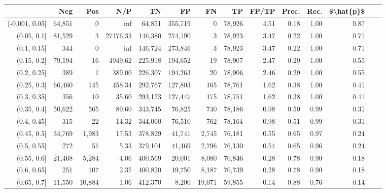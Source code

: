 \begin{tabular}{rrrrrrrrrrrrrr}
\toprule
{} &     Neg &     Pos &       N/P &       TN &       FP &      FN &      TP & FP/TP & Prec. &  Rec. & \$\textbackslash hat\{p\}\$ \\
\midrule
(-0.001, 0.05] &  64,851 &       0 &       inf &   64,851 &  355,719 &       0 &  78,926 &  4.51 &  0.18 &  1.00 &      0.87 \\
(0.05, 0.1]    &  81,529 &       3 &  27176.33 &  146,380 &  274,190 &       3 &  78,923 &  3.47 &  0.22 &  1.00 &      0.71 \\
(0.1, 0.15]    &     344 &       0 &       inf &  146,724 &  273,846 &       3 &  78,923 &  3.47 &  0.22 &  1.00 &      0.71 \\
(0.15, 0.2]    &  79,194 &      16 &   4949.62 &  225,918 &  194,652 &      19 &  78,907 &  2.47 &  0.29 &  1.00 &      0.55 \\
(0.2, 0.25]    &     389 &       1 &    389.00 &  226,307 &  194,263 &      20 &  78,906 &  2.46 &  0.29 &  1.00 &      0.55 \\
(0.25, 0.3]    &  66,460 &     145 &    458.34 &  292,767 &  127,803 &     165 &  78,761 &  1.62 &  0.38 &  1.00 &      0.41 \\
(0.3, 0.35]    &     356 &      10 &     35.60 &  293,123 &  127,447 &     175 &  78,751 &  1.62 &  0.38 &  1.00 &      0.41 \\
(0.35, 0.4]    &  50,622 &     565 &     89.60 &  343,745 &   76,825 &     740 &  78,186 &  0.98 &  0.50 &  0.99 &      0.31 \\
(0.4, 0.45]    &     315 &      22 &     14.32 &  344,060 &   76,510 &     762 &  78,164 &  0.98 &  0.51 &  0.99 &      0.31 \\
(0.45, 0.5]    &  34,769 &   1,983 &     17.53 &  378,829 &   41,741 &   2,745 &  76,181 &  0.55 &  0.65 &  0.97 &      0.24 \\
(0.5, 0.55]    &     272 &      51 &      5.33 &  379,101 &   41,469 &   2,796 &  76,130 &  0.54 &  0.65 &  0.96 &      0.24 \\
(0.55, 0.6]    &  21,468 &   5,284 &      4.06 &  400,569 &   20,001 &   8,080 &  70,846 &  0.28 &  0.78 &  0.90 &      0.18 \\
(0.6, 0.65]    &     251 &     107 &      2.35 &  400,820 &   19,750 &   8,187 &  70,739 &  0.28 &  0.78 &  0.90 &      0.18 \\
(0.65, 0.7]    &  11,550 &  10,884 &      1.06 &  412,370 &    8,200 &  19,071 &  59,855 &  0.14 &  0.88 &  0.76 &      0.14 \\

\end{tabular}
